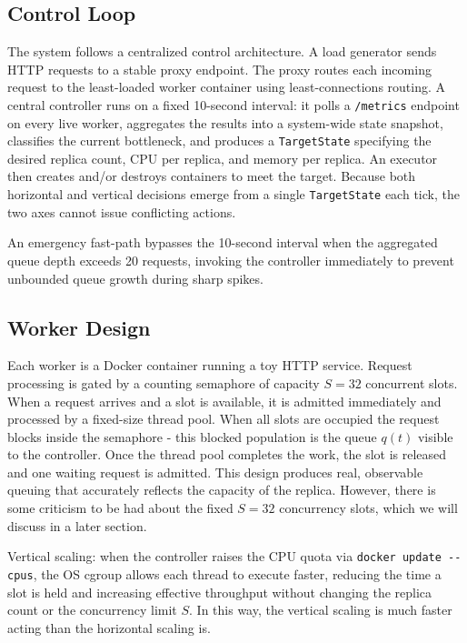 \documentclass[twocolumn]{article}
\begin{document}
\subsection{Control Loop}
\label{sec:org9467150}

The system follows a centralized control architecture. A load generator sends HTTP requests to a stable proxy endpoint. The proxy routes each incoming request to the least-loaded worker container using least-connections routing. A central controller runs on a fixed 10-second interval: it polls a \texttt{/metrics} endpoint on every live worker, aggregates the results into a system-wide state snapshot, classifies the current bottleneck, and produces a \texttt{TargetState} specifying the desired replica count, CPU per replica, and memory per replica. An executor then creates and/or destroys containers to meet the target. Because both horizontal and vertical decisions emerge from a single \texttt{TargetState} each tick, the two axes cannot issue conflicting actions.

An emergency fast-path bypasses the 10-second interval when the aggregated queue depth exceeds 20 requests, invoking the controller immediately to prevent unbounded queue growth during sharp spikes.
\subsection{Worker Design}
\label{sec:orgf5a44b4}

Each worker is a Docker container running a toy HTTP service. Request processing is gated by a counting semaphore of capacity \(S = 32\) concurrent slots. When a request arrives and a slot is available, it is admitted immediately and processed by a fixed-size thread pool. When all slots are occupied the request blocks inside the semaphore - this blocked population is the queue \(q(t)\) visible to the controller. Once the thread pool completes the work, the slot is released and one waiting request is admitted. This design produces real, observable queuing that accurately reflects the capacity of the replica. However, there is some criticism to be had about the fixed \(S = 32\) concurrency slots, which we will discuss in a later section.

Vertical scaling: when the controller raises the CPU quota via \texttt{docker update -{}-{}cpus}, the OS cgroup allows each thread to execute faster, reducing the time a slot is held and increasing effective throughput without changing the replica count or the concurrency limit \(S\). In this way, the vertical scaling is much faster acting than the horizontal scaling is.
\end{document}
